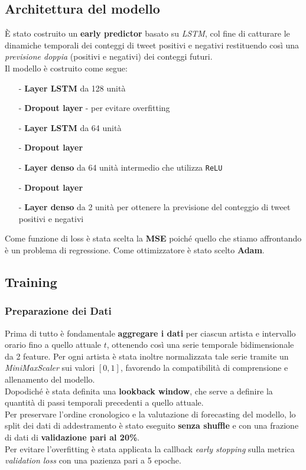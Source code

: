 \documentclass[a4paper,12pt]{article}
\begin{document}
\subsection{Architettura del modello}
È stato costruito un \textbf{early predictor} basato su \textit{LSTM}, col fine di catturare le dinamiche temporali dei conteggi di tweet positivi e negativi restituendo così una \textit{previsione doppia} (positivi e negativi) dei conteggi futuri.\\
Il modello è costruito come segue:
\begin{itemize}
    \item [-] \textbf{Layer LSTM} da 128 unità
    \item [-] \textbf{Dropout layer} - per evitare overfitting
    \item [-] \textbf{Layer LSTM} da 64 unità
    \item [-] \textbf{Dropout layer} 
    \item [-] \textbf{Layer denso} da 64 unità intermedio che utilizza \texttt{ReLU}
    \item [-] \textbf{Dropout layer}
    \item [-] \textbf{Layer denso} da 2 unità per ottenere la previsione del conteggio di tweet positivi e negativi
\end{itemize}
Come funzione di loss è stata scelta la \textbf{MSE} poiché quello che stiamo affrontando è un problema di regressione.
Come ottimizzatore è stato scelto \textbf{Adam}.

\subsection{Training}
\subsubsection{Preparazione dei Dati}
Prima di tutto è fondamentale \textbf{aggregare i dati} per ciascun artista e intervallo orario fino a quello attuale \(t\), ottenendo così una serie temporale bidimensionale da 2 feature. Per ogni artista è stata inoltre normalizzata tale serie tramite un \textit{MiniMaxScaler} sui valori \([0,1]\), favorendo la compatibilità di comprensione e allenamento del modello.\\
Dopodiché è stata definita una \textbf{lookback window}, che serve a definire la quantità di passi temporali precedenti a quello attuale.\\
Per preservare l'ordine cronologico e la valutazione di forecasting del modello, lo split dei dati di addestramento è stato eseguito \textbf{senza shuffle} e con una frazione di dati di \textbf{validazione pari al 20\%}.\\
Per evitare l'overfitting è stata applicata la callback \textit{early stopping} sulla metrica \textit{validation loss} con una pazienza pari a 5 epoche.\\
\end{document}
